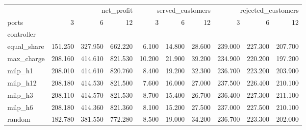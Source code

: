 \begin{tabular}{lrrrrrrrrr}
\toprule
 & \multicolumn{3}{r}{net_profit} & \multicolumn{3}{r}{served_customers} & \multicolumn{3}{r}{rejected_customers} \\
ports & 3 & 6 & 12 & 3 & 6 & 12 & 3 & 6 & 12 \\
controller &  &  &  &  &  &  &  &  &  \\
\midrule
equal_share & 151.250 & 327.950 & 662.220 & 6.100 & 14.800 & 28.600 & 239.000 & 227.300 & 207.700 \\
max_charge & 208.160 & 414.610 & 821.530 & 10.200 & 21.900 & 39.200 & 234.900 & 220.200 & 197.200 \\
milp_h1 & 208.010 & 414.610 & 820.760 & 8.400 & 19.200 & 32.300 & 236.700 & 223.200 & 203.900 \\
milp_h12 & 208.180 & 414.530 & 821.500 & 7.600 & 16.000 & 27.000 & 237.500 & 226.400 & 210.100 \\
milp_h3 & 208.110 & 414.570 & 821.530 & 8.700 & 15.400 & 26.700 & 236.400 & 227.300 & 211.100 \\
milp_h6 & 208.180 & 414.360 & 821.360 & 8.100 & 15.200 & 27.500 & 237.000 & 227.500 & 210.100 \\
random & 182.780 & 381.550 & 772.280 & 8.500 & 19.000 & 34.200 & 236.700 & 223.300 & 202.000 \\
\bottomrule
\end{tabular}
